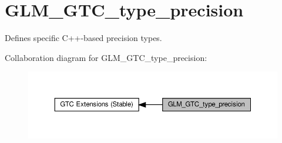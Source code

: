 \hypertarget{group__gtc__type__precision}{}\section{G\+L\+M\+\_\+\+G\+T\+C\+\_\+type\+\_\+precision}
\label{group__gtc__type__precision}


Defines specific C++-\/based precision types.  


Collaboration diagram for G\+L\+M\+\_\+\+G\+T\+C\+\_\+type\+\_\+precision\+:\nopagebreak
\begin{figure}[H]
\begin{center}
\leavevmode
\includegraphics[width=350pt]{group__gtc__type__precision}
\end{center}
\end{figure}
